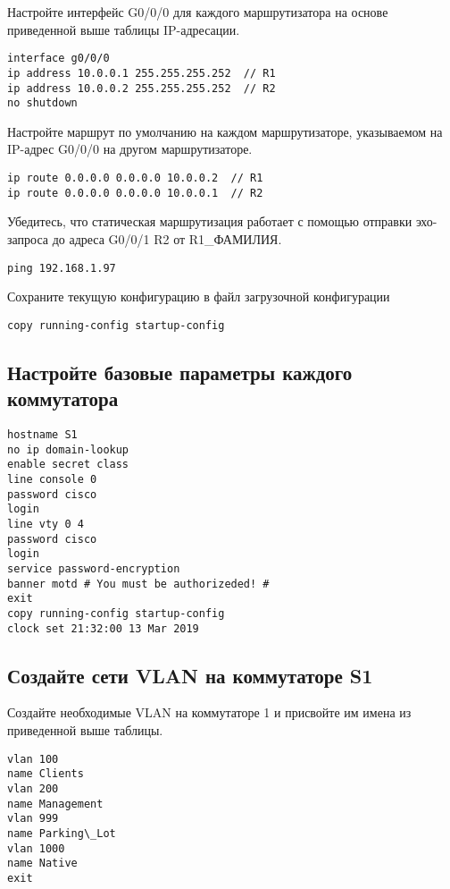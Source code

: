 Настройте интерфейс G0/0/0 для каждого маршрутизатора
на основе приведенной выше таблицы IP-адресации.

\begin{verbatim}
interface g0/0/0
ip address 10.0.0.1 255.255.255.252  // R1
ip address 10.0.0.2 255.255.255.252  // R2
no shutdown
\end{verbatim}

Настройте маршрут по умолчанию на каждом маршрутизаторе,
указываемом на IP-адрес G0/0/0 на другом маршрутизаторе.

\begin{verbatim}
ip route 0.0.0.0 0.0.0.0 10.0.0.2  // R1
ip route 0.0.0.0 0.0.0.0 10.0.0.1  // R2
\end{verbatim}

Убедитесь, что статическая маршрутизация работает
с помощью отправки эхо-запроса до адреса G0/0/1 R2 от R1\_ФАМИЛИЯ.

\begin{verbatim}
ping 192.168.1.97
\end{verbatim}

Сохраните текущую конфигурацию в файл загрузочной конфигурации

\begin{verbatim}
copy running-config startup-config
\end{verbatim}

\subsection{Настройте базовые параметры каждого коммутатора}

\begin{verbatim}
hostname S1
no ip domain-lookup
enable secret class
line console 0
password cisco
login
line vty 0 4
password cisco
login
service password-encryption
banner motd # You must be authorizeded! #
exit
copy running-config startup-config
clock set 21:32:00 13 Mar 2019
\end{verbatim}

\subsection{Создайте сети VLAN на коммутаторе S1}

Создайте необходимые VLAN на коммутаторе 1
и присвойте им имена из приведенной выше таблицы.

\begin{verbatim}
vlan 100
name Clients
vlan 200
name Management
vlan 999
name Parking\_Lot
vlan 1000
name Native
exit
\end{verbatim}

